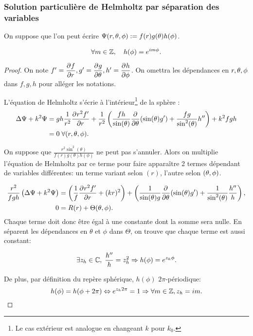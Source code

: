 \subsubsection{Solution particulière de Helmholtz par séparation des variables}
\begin{hyp}
On suppose que l'on peut écrire \(\Psi(\rtp) : = f(r)g(\theta)h(\phi)\).
\end{hyp}
\begin{prop}
\begin{equation}
\forall m \in \ZZ, \quad h(\phi) = e^{im\phi}.
\end{equation}
\end{prop}
\begin{proof}
On note \(f' =\ddr{r}{f}, g' = \ddr{\theta}{g} , h' = \ddr{\phi}{h}\). On omettra les dépendances en \(\rtp\) dans \(f,g,h\) pour alléger les notations.

L'équation de Helmholtz s'écrie à l'intérieur\footnote{Le cas extérieur est analogue en changeant \(k\) pour \(k_0\).} de la sphère :
\begin{align}\label{eq:helm:helm}
  \Delta \Psi + k^2 \Psi &= gh\frac{1}{r^2}\ddr{r}{r^2f'} + \frac{1}{r^2}\left(\frac{fh}{\sin(\theta)}\ddr{\theta}{}(\sin(\theta)g')+\frac{fg}{\sin^2(\theta)}h''\right) + k^2 fgh 
  \\
  &= 0 \; \forall (r,\tp).
\end{align}

On suppose que \( \frac{r^2\sin^2(\theta)}{f(r)g(\theta)h(\phi)}\) ne peut pas s'annuler. Alors on multiplie l'équation de Helmholtz par ce terme pour faire apparaître 2 termes dépendant de variables différentes: un terme variant selon \((r)\), l'autre selon \((\tp)\).

\begin{align*}
\frac{r^2}{fgh} \left(\Delta \Psi + k^2 \Psi\right) &=
\left(\frac{1}{f}\ddr{r}{r^2f'} + (kr)^2\right) +
\left(\frac{1}{ \sin(\theta)g} \ddr{\theta}{}(\sin(\theta)g') +  \frac{1}{ \sin^2(\theta)}\frac{h''}{h} \right),
\\
0 &=R(r) + \Theta(\tp).
\end{align*}
Chaque terme doit donc être égal à une constante dont la somme sera nulle. En séparent les dépendances en \(\theta\) et \(\phi\) dans \(\Theta\), on trouve que chaque terme est aussi constant:

\[
\exists z_h \in \CC,\; \frac{h''}{h} = z_h^2 \Rightarrow h(\phi) = e^{z_h\phi}.
\]

De plus, par définition du repère sphérique, \(h(\phi)\) \(2\pi\)-périodique:
\[
h(\phi) = h(\phi + 2\pi) \Leftrightarrow e^{z_h2\pi}= 1 \Rightarrow \forall m \in \ZZ, z_h = im.
\]
\end{proof}


